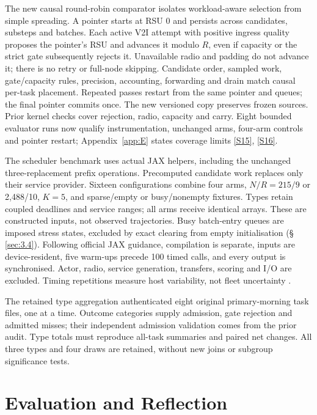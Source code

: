 \documentclass[11pt,a4paper]{article}
\begin{document}
The new causal round-robin comparator isolates workload-aware selection from simple spreading. A pointer starts at RSU 0 and persists across candidates, substeps and batches. Each active V2I attempt with positive ingress quality proposes the pointer's RSU and advances it modulo $R$, even if capacity or the strict gate subsequently rejects it. Unavailable radio and padding do not advance it; there is no retry or full-node skipping. Candidate order, sampled work, gate/capacity rules, precision, accounting, forwarding and drain match causal per-task placement. Repeated passes restart from the same pointer and queues; the final pointer commits once. The new versioned copy preserves frozen sources. Prior kernel checks cover rejection, radio, capacity and carry. Eight bounded evaluator runs now qualify instrumentation, unchanged arms, four-arm controls and pointer restart; Appendix~\ref{app:E} states coverage limits \hyperref[source-s15]{[S15]}, \hyperref[source-s16]{[S16]}.

The scheduler benchmark uses actual JAX helpers, including the unchanged three-replacement prefix operations. Precomputed candidate work replaces only their service provider. Sixteen configurations combine four arms, $N/R=215/9$ or 2,488/10, $K=5$, and sparse/empty or busy/nonempty fixtures. Types retain coupled deadlines and service ranges; all arms receive identical arrays. These are constructed inputs, not observed trajectories. Busy batch-entry queues are imposed stress states, excluded by exact clearing from empty initialisation (\S\,\ref{sec:3.4}). Following official JAX guidance, compilation is separate, inputs are device-resident, five warm-ups precede 100 timed calls, and every output is synchronised. Actor, radio, service generation, transfers, scoring and I/O are excluded. Timing repetitions measure host variability, not fleet uncertainty \cite{ref14}.

The retained type aggregation authenticated eight original primary-morning task files, one at a time. Outcome categories supply admission, gate rejection and admitted misses; their independent admission validation comes from the prior audit. Type totals must reproduce all-task summaries and paired net changes. All three types and four draws are retained, without new joins or subgroup significance tests.

\section{Evaluation and Reflection}\label{sec:3}
\end{document}

